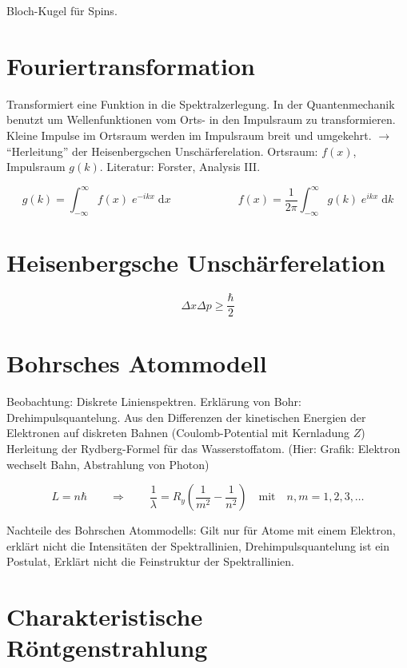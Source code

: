\documentclass[a4paper,german,10pt,smallheadings]{scrartcl}
\begin{document}
Bloch-Kugel für Spins.

\newpage
\section{Fouriertransformation}
Transformiert eine Funktion in die Spektralzerlegung. In der Quantenmechanik
benutzt um Wellenfunktionen vom Orts- in den Impulsraum zu transformieren.
Kleine Impulse im Ortsraum werden im Impulsraum breit und umgekehrt. $\to$
``Herleitung'' der Heisenbergschen Unschärferelation. Ortsraum: $f(x)$,
Impulsraum $g(k)$. Literatur: Forster, Analysis III.

\begin{equation*}
  g(k) = \int_{-\infty}^{\infty} f(x) \; e^{-ikx} \;\text{d}x 
  \qquad
  \qquad
  \qquad
  f(x) = \frac{1}{2 \pi} \int_{-\infty}^{\infty} g(k) \; e^{ikx} \;\text{d}k
\end{equation*}

\section{Heisenbergsche Unschärferelation}
\begin{equation*}
  \Delta x \Delta p \ge \frac{\hbar}{2}
\end{equation*}

\section{Bohrsches Atommodell}
Beobachtung: Diskrete Linienspektren. Erklärung von Bohr: Drehimpulsquantelung.
Aus den Differenzen der kinetischen
Energien der Elektronen auf diskreten Bahnen (Coulomb-Potential mit Kernladung $Z$) Herleitung der Rydberg-Formel für
das Wasserstoffatom. (Hier: Grafik: Elektron wechselt Bahn, Abstrahlung von Photon)

\begin{equation*}
  L = n \hbar
  \qquad \Rightarrow \qquad
  \frac{1}{\lambda} = R_y \left( \frac{1}{m^2} - \frac{1}{n^2} \right) \quad \text{mit} \quad n,m = 1, 2, 3, \dots
\end{equation*}

Nachteile des Bohrschen Atommodells: Gilt nur für Atome mit einem Elektron,
erklärt nicht die Intensitäten der Spektrallinien, Drehimpulsquantelung ist ein
Postulat, Erklärt nicht die Feinstruktur der Spektrallinien.

\section{Charakteristische Röntgenstrahlung}
\end{document}
